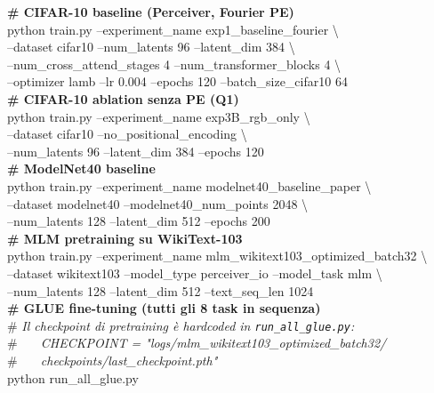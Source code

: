 \documentclass[
  11pt,
]{article}
\begin{document}
\begin{tcolorbox}[colback=gray!5, colframe=gray!40, boxrule=0.5pt, arc=2pt, left=6pt, right=6pt, top=4pt, bottom=4pt, fontupper=\ttfamily\footnotesize]
\textbf{\# CIFAR-10 baseline (Perceiver, Fourier PE)} \\
python train.py --experiment\_name exp1\_baseline\_fourier \textbackslash \\
\hspace*{1em}--dataset cifar10 --num\_latents 96 --latent\_dim 384 \textbackslash \\
\hspace*{1em}--num\_cross\_attend\_stages 4 --num\_transformer\_blocks 4 \textbackslash \\
\hspace*{1em}--optimizer lamb --lr 0.004 --epochs 120 --batch\_size\_cifar10 64 \\[6pt]

\textbf{\# CIFAR-10 ablation senza PE (Q1)} \\
python train.py --experiment\_name exp3B\_rgb\_only \textbackslash \\
\hspace*{1em}--dataset cifar10 --no\_positional\_encoding \textbackslash \\
\hspace*{1em}--num\_latents 96 --latent\_dim 384 --epochs 120 \\[6pt]

\textbf{\# ModelNet40 baseline} \\
python train.py --experiment\_name modelnet40\_baseline\_paper \textbackslash \\
\hspace*{1em}--dataset modelnet40 --modelnet40\_num\_points 2048 \textbackslash \\
\hspace*{1em}--num\_latents 128 --latent\_dim 512 --epochs 200 \\[6pt]

\textbf{\# MLM pretraining su WikiText-103} \\
python train.py --experiment\_name mlm\_wikitext103\_optimized\_batch32 \textbackslash \\
\hspace*{1em}--dataset wikitext103 --model\_type perceiver\_io --model\_task mlm \textbackslash \\
\hspace*{1em}--num\_latents 128 --latent\_dim 512 --text\_seq\_len 1024 \\[6pt]

\textbf{\# GLUE fine-tuning (tutti gli 8 task in sequenza)} \\
\# \emph{Il checkpoint di pretraining \`e hardcoded in \texttt{run\_all\_glue.py}:} \\
\# \emph{\ \ \ CHECKPOINT = "logs/mlm\_wikitext103\_optimized\_batch32/} \\
\# \emph{\ \ \ checkpoints/last\_checkpoint.pth"} \\
python run\_all\_glue.py
\end{tcolorbox}
\end{document}
